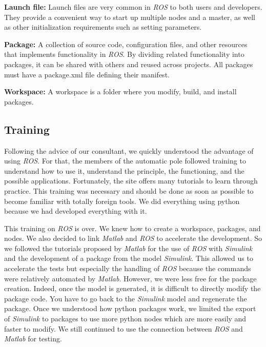 \bigbreak
\textbf{Launch file:} Launch files are very common in \textit{ROS} to both users and developers. They provide a convenient way to start up multiple nodes and a master, as well as other initialization requirements such as setting parameters.

\bigbreak
\textbf{Package:} A collection of source code, configuration files, and other resources that implements functionality in \textit{ROS}. By dividing related functionality into packages, it can be shared with others and reused across projects. All packages must have a package.xml file defining their manifest.

\bigbreak
\textbf{Workspace:} A workspace is a folder where you modify, build, and install packages.

\subsection{Training}

Following the advice of our consultant, we quickly understood the advantage of using \textit{ROS}. For that, the members of the automatic pole followed training to understand how to use it, understand the principle, the functioning, and the possible applications. Fortunately, the site offers many tutorials to learn through practice. This training was necessary and should be done as soon as possible to become familiar with totally foreign tools. We did everything using python because we had developed everything with it. 

\bigbreak
This training on \textit{ROS} is over. We knew how to create a workspace, packages, and nodes. We also decided to link \textit{Matlab} and \textit{ROS} to accelerate the development. So we followed the tutorials proposed by \textit{Matlab}\cite{MatlabROS} for the use of \textit{ROS} with \textit{Simulink} and the development of a package from the model \textit{Simulink}. This allowed us to accelerate the tests but especially the handling of \textit{ROS} because the commands were relatively automated by \textit{Matlab}. However, we were less free for the package creation. Indeed, once the model is generated, it is difficult to directly modify the package code. You have to go back to the \textit{Simulink} model and regenerate the package. Once we understood how python packages work, we limited the export of \textit{Simulink} to packages to use more python nodes which are more easily and faster to modify. We still continued to use the connection between \textit{ROS} and \textit{Matlab} for testing.

